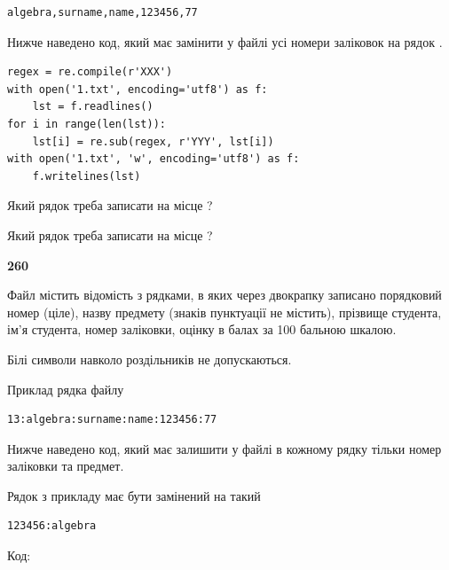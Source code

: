 \begin{verbatim}
algebra,surname,name,123456,77
\end{verbatim}


Нижче наведено код, який має замінити у файлі усі номери заліковок на рядок \code{***}.



\begin{verbatim}
regex = re.compile(r'XXX')
with open('1.txt', encoding='utf8') as f:
    lst = f.readlines()
for i in range(len(lst)):
    lst[i] = re.sub(regex, r'YYY', lst[i])
with open('1.txt', 'w', encoding='utf8') as f:
    f.writelines(lst)
\end{verbatim}







Який рядок треба записати на місце  ?\par
\vspace{5mm}


Який рядок треба записати на місце  ?\par


\newpage

{\begin {center}\textbf{ 260}\end {center}}\par
Файл  містить відомість з рядками, в яких через двокрапку записано поряд\-ковий номер (ціле), назву предмету (знаків пунктуації не містить), прізвище студента, ім'я студента, номер заліковки, оцінку в балах за 100 бальною шкалою.

Білі символи навколо роздільників не допускаються.

Приклад рядка файлу



\begin{verbatim}
13:algebra:surname:name:123456:77
\end{verbatim}


Нижче наведено код, який має залишити у файлі в кожному рядку тільки номер заліковки та предмет.

Рядок з прикладу має бути замінений на такий



\begin{verbatim}
123456:algebra
\end{verbatim}




Код:



